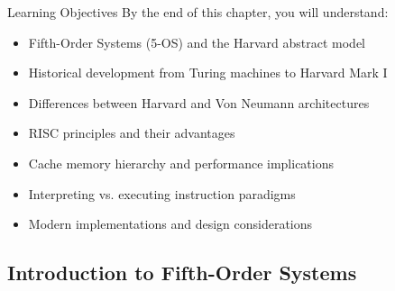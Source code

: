 
\begin{frame}{Learning Objectives}
By the end of this chapter, you will understand:
\begin{itemize}
\item Fifth-Order Systems (5-OS) and the Harvard abstract model
\item Historical development from Turing machines to Harvard Mark I
\item Differences between Harvard and Von Neumann architectures
\item RISC principles and their advantages
\item Cache memory hierarchy and performance implications
\item Interpreting vs. executing instruction paradigms
\item Modern implementations and design considerations
\end{itemize}
\end{frame}

\subsection{Introduction to Fifth-Order Systems}

